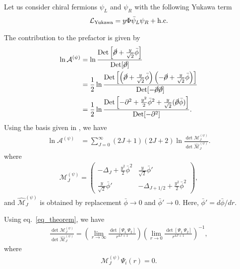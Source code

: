 \documentclass[12pt]{article}
\begin{document}
Let us consider chiral fermions $\psi_L$ and $\psi_R$ with the
following Yukawa term
\begin{align}
  \mathcal L_{\rm Yukawa} = y \Phi \bar{\psi}_L \psi_R + {\rm h.c.}
\end{align}

The contribution to the prefactor is given by
\begin{align}
  \ln\mathcal A^{(\psi)}
  & = \ln\frac{\det
    \left[
      \cancel\partial+\frac{y}{\sqrt{2}}\bar\phi
    \right]}{\det[\cancel\partial]}
  \nonumber
  \\
  & = \frac{1}{2}\ln\frac{\det
  \left[
   \left(
    \cancel\partial+\frac{y}{\sqrt{2}}\bar\phi
   \right)
   \left(-\cancel\partial+\frac{y}{\sqrt{2}}\bar\phi
   \right)
  \right]}{\det[-\cancel\partial\cancel\partial]}\nonumber \\
  & = \frac{1}{2}\ln\frac{\det
  \left[
   -\partial^2+\frac{y^2}{2}\bar\phi^2+\frac{y}{\sqrt{2}}(\cancel\partial\bar\phi)
  \right]}{\det[-\partial^2]}.
\end{align}
Using the basis given in \cite{Avan:1985eg}, we have
\begin{align}
 \ln\mathcal A^{(\psi)}
  & = \sum_{J=0}^{\infty} (2J+1)(2J+2)
 \ln\frac{\det\mathcal M^{(\psi)}_J}{\det\widehat{\mathcal M}^{(\psi)}_J}.
\end{align}
where
\begin{align}
 \mathcal M^{(\psi)}_J =
 \begin{pmatrix}
  -\Delta_J+\frac{y^2}{2}\bar\phi^2 & \frac{y}{\sqrt{2}}\bar\phi'             \\
  \frac{y}{\sqrt{2}}\bar\phi'       & -\Delta_{J+1/2}+\frac{y^2}{2}\bar\phi^2
 \end{pmatrix},
\end{align}
and $\widehat{\mathcal M}^{(\psi)}_J$ is obtained by replacement
$\bar\phi\to0$ and $\bar\phi'\to0$. Here, $\bar\phi'=d\bar\phi/dr$.

Using eq.~\eqref{eq_theorem}, we have
\begin{align}
 \frac{\det\mathcal M^{(\psi)}_J}{\det\widehat{\mathcal M}^{(\psi)}_J}
 =
 \left(
  \lim_{r\to\infty}\frac{\det[\Psi_1~\Psi_2]}{r^{4J+1}}
 \right)
 \left(
  \lim_{r\to0}\frac{\det[\Psi_1~\Psi_2]}{r^{4J+1}}
 \right)^{-1},
\end{align}
where
\begin{align}
 \mathcal M^{(\psi)}_J\Psi_i(r) = 0.
\end{align}
\end{document}
